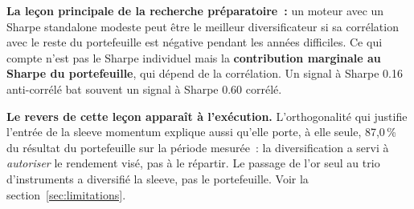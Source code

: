 \begin{insightbox}
\textbf{La leçon principale de la recherche préparatoire~:} un moteur avec un Sharpe standalone modeste peut être le meilleur diversificateur si sa corrélation avec le reste du portefeuille est négative pendant les années difficiles. Ce qui compte n'est pas le Sharpe individuel mais la \textbf{contribution marginale au Sharpe du portefeuille}, qui dépend de la corrélation. Un signal à Sharpe 0.16 anti-corrélé bat souvent un signal à Sharpe 0.60 corrélé.
\end{insightbox}

\begin{insightbox}
\textbf{Le revers de cette leçon apparaît à l'exécution.} L'orthogonalité qui justifie l'entrée de la sleeve momentum explique aussi qu'elle porte, à elle seule, 87,0\,\% du résultat du portefeuille sur la période mesurée~: la diversification a servi à \emph{autoriser} le rendement visé, pas à le répartir. Le passage de l'or seul au trio d'instruments a diversifié la sleeve, pas le portefeuille. Voir la section~\ref{sec:limitations}.
\end{insightbox}
